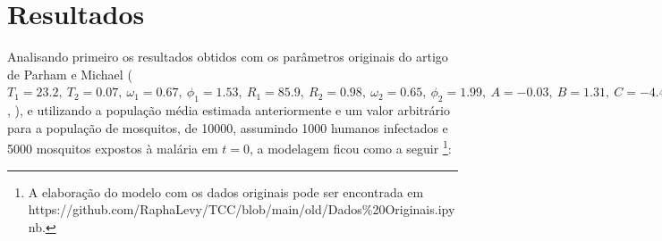 \chapter{Resultados}

Analisando primeiro os resultados obtidos com os parâmetros originais 
do artigo de Parham e Michael ($T_1=23.2, \ T_2=0.07, \ \omega_1=0.67, 
\ \phi_1=1.53, \ R_1=85.9, \ R_2=0.98, \ \omega_2=0.65, \ \phi_2=1.99, 
\ A=-0.03, \ B=1.31, \ C=-4.4, \ b_1=0.04, \ b_2 = 0.09, \ T_{min}=14.5, 
\ \gamma= 1/120,\ R_L = 50, \ c_1=0.00554, \ c_2=-0.06737$ \cite{Parham2010}, \cite{OKUNEYE201772}), 
e utilizando a população média estimada anteriormente e um valor arbitrário 
para a população de mosquitos, de 10000, assumindo 1000 humanos infectados 
e 5000 mosquitos expostos à malária em $t=0$, a modelagem ficou como a seguir 
\footnote{A elaboração do modelo com os dados originais pode ser encontrada em
https://github.com/RaphaLevy/TCC/blob/main/old/Dados\%20Originais.ipynb.}: 







